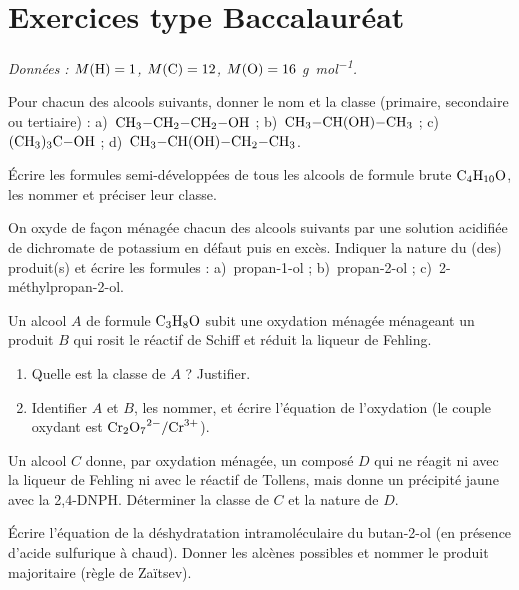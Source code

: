 \section{Exercices type Baccalauréat}
\textit{Données : $M(\ce{H})=1$, $M(\ce{C})=12$, $M(\ce{O})=16$ \si{\gram\per\mol}.}


\exo{} Pour chacun des alcools suivants, donner le nom et la classe
(primaire, secondaire ou tertiaire) : a)~$\ce{CH3-CH2-CH2-OH}$ ;
b)~$\ce{CH3-CH(OH)-CH3}$ ; c)~$\ce{(CH3)3C-OH}$ ; d)~$\ce{CH3-CH(OH)-CH2-CH3}$.

\exo{} Écrire les formules semi-développées de tous les alcools de formule
brute $\ce{C4H10O}$, les nommer et préciser leur classe.


\exo{} On oxyde de façon ménagée chacun des alcools suivants par une solution
acidifiée de dichromate de potassium en défaut puis en excès. Indiquer la nature du
(des) produit(s) et écrire les formules :
a)~propan-1-ol ; b)~propan-2-ol ; c)~2-méthylpropan-2-ol.

\exo{} Un alcool $A$ de formule $\ce{C3H8O}$ subit une oxydation ménagée
ménageant un produit $B$ qui rosit le réactif de Schiff et réduit la liqueur de Fehling.
\begin{enumerate}[label=\arabic*)]
\item Quelle est la classe de $A$ ? Justifier.
\item Identifier $A$ et $B$, les nommer, et écrire l'équation de l'oxydation
(le couple oxydant est $\ce{Cr2O7^2-}/\ce{Cr^3+}$).
\end{enumerate}

\exo{} Un alcool $C$ donne, par oxydation ménagée, un composé $D$ qui ne
réagit ni avec la liqueur de Fehling ni avec le réactif de Tollens, mais donne un
précipité jaune avec la 2,4-DNPH. Déterminer la classe de $C$ et la nature de $D$.


\exo{} Écrire l'équation de la déshydratation intramoléculaire du butan-2-ol
(en présence d'acide sulfurique à chaud). Donner les alcènes possibles et nommer le
produit majoritaire (règle de Zaïtsev).

